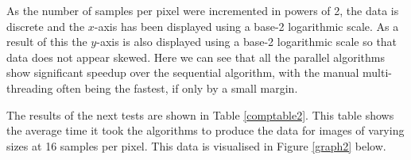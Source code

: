 \documentclass[journal,transmag]{IEEEtran}
\begin{document}
	As the number of samples per pixel were incremented in powers of 2, the data is discrete and the $x$-axis has been displayed using a base-2 logarithmic scale. As a result of this the $y$-axis is also displayed using a base-2 logarithmic scale so that data does not appear skewed. Here we can see that all the parallel algorithms show significant speedup over the sequential algorithm, with the manual multi-threading often being the fastest, if only by a small margin.
	
	The results of the next tests are shown in Table \ref{comptable2}. This table shows the average time it took the algorithms to produce the data for images of varying sizes at 16 samples per pixel. This data is visualised in Figure \ref{graph2} below.

	\begin{table}[!h]
		\caption{16 Spp Image Generation Performance Comparison}
		\label{comptable2}
		\centering
	\end{table}
	
\end{document}
